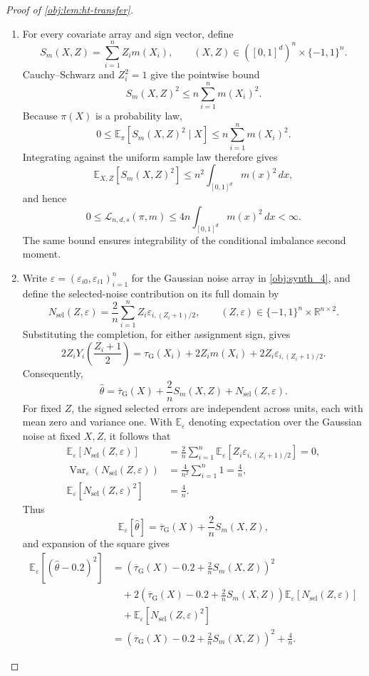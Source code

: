 \documentclass[11pt]{article}
\begin{document}
\begin{proof}[Proof of \cref{obj:lem:ht-transfer}]
\begin{enumerate}
\item
For every covariate array and sign vector, define
\[
S_m(X,Z)=\sum_{i=1}^n Z_i m(X_i),
\qquad
(X,Z)\in([0,1]^d)^n\times\{-1,1\}^n.
\]
Cauchy--Schwarz and \(Z_i^2=1\) give the pointwise bound
\[
S_m(X,Z)^2
\leq
n\sum_{i=1}^n m(X_i)^2.
\]
Because \(\pi(X)\) is a probability law,
\[
0\leq
\mathbb E_\pi[S_m(X,Z)^2\mid X]
\leq
n\sum_{i=1}^n m(X_i)^2.
\]
Integrating against the uniform sample law therefore gives
\[
\mathbb E_{X,Z}[S_m(X,Z)^2]
\leq
n^2\int_{[0,1]^d}m(x)^2\,dx,
\]
and hence
\[
0\leq\mathcal L_{n,d,s}(\pi,m)
\leq
4n\int_{[0,1]^d}m(x)^2\,dx
<\infty.
\]
The same bound ensures integrability of the conditional imbalance second moment. %

\item
Write \(\varepsilon=(\varepsilon_{i0},\varepsilon_{i1})_{i=1}^n\) for the Gaussian noise array in \cref{obj:synth_4}, and define the selected-noise contribution on its full domain by
\[
N_{\mathrm{sel}}(Z,\varepsilon)
=
\frac2n\sum_{i=1}^n
Z_i\varepsilon_{i,(Z_i+1)/2},
\qquad
(Z,\varepsilon)\in\{-1,1\}^n\times\mathbb R^{n\times2}.
\]
Substituting the completion, for either assignment sign, gives
\[
2Z_iY_i\!\left(\frac{Z_i+1}{2}\right)
=
\tau_{\mathrm G}(X_i)
+2Z_i m(X_i)
+2Z_i\varepsilon_{i,(Z_i+1)/2}.
\]
Consequently,
\[
\widehat\theta
=
\overline\tau_{\mathrm G}(X)
+\frac2n S_m(X,Z)
+N_{\mathrm{sel}}(Z,\varepsilon).
\]
For fixed \(Z\), the signed selected errors are independent across units, each with mean zero and variance one. With \(\mathbb E_\varepsilon\) denoting expectation over the Gaussian noise at fixed \(X,Z\), it follows that
\[
\begin{aligned}
\mathbb E_\varepsilon[N_{\mathrm{sel}}(Z,\varepsilon)]
&=
\frac2n\sum_{i=1}^n
\mathbb E_\varepsilon[
Z_i\varepsilon_{i,(Z_i+1)/2}]
=0,\\
\operatorname{Var}_\varepsilon(N_{\mathrm{sel}}(Z,\varepsilon))
&=
\frac4{n^2}\sum_{i=1}^n1
=\frac4n,\\
\mathbb E_\varepsilon[N_{\mathrm{sel}}(Z,\varepsilon)^2]
&=\frac4n.
\end{aligned}
\]
Thus
\[
\mathbb E_\varepsilon[\widehat\theta]
=
\overline\tau_{\mathrm G}(X)+\frac2n S_m(X,Z),
\]
and expansion of the square gives
\[
\begin{aligned}
\mathbb E_\varepsilon[(\widehat\theta-0.2)^2]
&=
\left(
\overline\tau_{\mathrm G}(X)-0.2+\frac2n S_m(X,Z)
\right)^2\\
&\quad+
2\left(
\overline\tau_{\mathrm G}(X)-0.2+\frac2n S_m(X,Z)
\right)
\mathbb E_\varepsilon[N_{\mathrm{sel}}(Z,\varepsilon)]\\
&\quad+
\mathbb E_\varepsilon[N_{\mathrm{sel}}(Z,\varepsilon)^2]\\
&=
\left(
\overline\tau_{\mathrm G}(X)-0.2+\frac2n S_m(X,Z)
\right)^2+\frac4n.
\end{aligned}
\]


\end{enumerate}
\end{proof}
\end{document}
